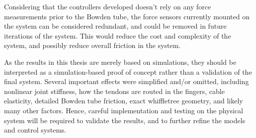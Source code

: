 Considering that the controllers developed doesn't rely on any force measurements prior to the Bowden tube, the force sensors currently mounted on the system can be considered redundant, and could be removed in future iterations of the system. This would reduce the cost and complexity of the system, and possibly reduce overall friction in the system.

As the results in this thesis are merely based on simulations, they should be interpreted as a simulation-based proof of concept rather than a validation of the final system. Several important effects were simplified and/or omitted, including nonlinear joint stiffness, how the tendons are routed in the fingers, cable elasticity, detailed Bowden tube friction, exact whiffletree geometry, and likely many other factors. Hence, careful implementation and testing on the physical system will be required to validate the results, and to further refine the models and control systems. 